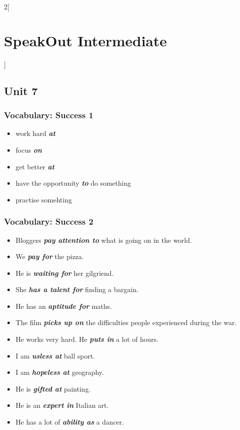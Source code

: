 \documentclass[10pt,a4paper]{article}
\newlength{\OriginalParIndent}
\newcommand\ex[1]{\textit{\textbf{{#1}}}}           %
\newenvironment{ItemizeWithOrigParIndent}
    {\begin{itemize}[leftmargin=\OriginalParIndent]}
    {\end{itemize}}
\begin{document}
\begin{multicols}{2}[\section{SpeakOut Intermediate}]
\subsection{Unit 7}
\subsubsection{Vocabulary: Success 1}
\begin{ItemizeWithOrigParIndent}
    \item work hard \ex{at}
    \item focus \ex{on}
    \item get better \ex{at}
    \item have the opportunity \ex{to} do something
    \item practise somehting
\end{ItemizeWithOrigParIndent}

\subsubsection{Vocabulary: Success 2}
\begin{ItemizeWithOrigParIndent}
    \item Bloggers \ex{pay attention to} what is going on in the world.
    \item We \ex{pay for} the pizza.
    \item He is \ex{waiting for} her gilgriend.
    \item She \ex{has a talent for} finding a bargain.
    \item He has an \ex{aptitude for} maths.
    \item The film \ex{picks up on} the difficulties people experienced during the war.
    \item He works very hard. He \ex{puts in} a lot of hours.
    \item I am \ex{usless at} ball sport.
    \item I am \ex{hopeless at} geography.
    \item He is \ex{gifted at} painting.
    \item He is an \ex{expert in} Italian art.
    \item He has a lot of \ex{ability as} a dancer.
\end{ItemizeWithOrigParIndent}


\end{multicols}
\end{document}
